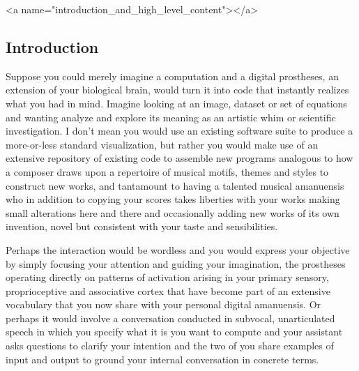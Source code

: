 
\rawhtml
<a name="introduction_and_high_level_content"></a>
\endrawhtml
\subsection*{Introduction}


Suppose you could merely imagine a computation and a digital prostheses, an extension of your biological brain, would turn it into code that instantly realizes what you had in mind. Imagine looking at an image, dataset or set of equations and wanting analyze and explore its meaning as an artistic whim or scientific investigation. I don't mean you would use an existing software suite to produce a more-or-less standard visualization, but rather you would make use of an extensive repository of existing code to assemble new programs analogous to how a composer draws upon a repertoire of musical motifs, themes and styles to construct new works, and tantamount to having a talented musical amanuensis who in addition to copying your scores takes liberties with your works making small alterations here and there and occasionally adding new works of its own invention, novel but consistent with your taste and sensibilities.

Perhaps the interaction would be wordless and you would express your objective by simply focusing your attention and guiding your imagination, the prostheses operating directly on patterns of activation arising in your primary sensory, proprioceptive and associative cortex that have become part of an extensive vocabulary that you now share with your personal digital amanuensis. Or perhaps it would involve a conversation conducted in subvocal, unarticulated speech in which you specify what it is you want to compute and your assistant asks questions to clarify your intention and the two of you share examples of input and output to ground your internal conversation in concrete terms. 

